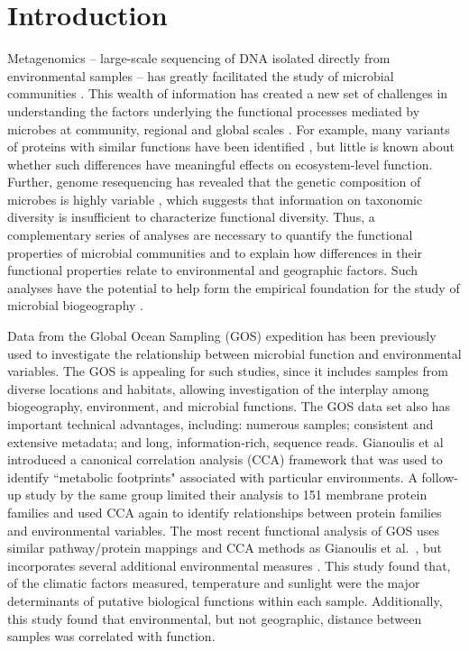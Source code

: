 \section{Introduction}

Metagenomics -- large-scale sequencing of DNA isolated directly from environmental samples -- has greatly facilitated the study of microbial communities \cite{RiesSchl04, Eise07, WoolGodz10, Hand04, RuscHalp07, DinsEdwa08}. This wealth of information has created a new set of challenges in understanding the factors underlying the functional processes mediated by microbes at community, regional and global scales \cite{Eise07}.  For example, many variants of proteins with similar functions have been identified \cite{YoosSutt07}, but little is known about whether such differences have meaningful effects on ecosystem-level function. Further, genome resequencing has revealed that the genetic composition of microbes is highly variable \cite{PernPlun01, TettMasi05, rasko_2008, KislHaeg11, BateCrop11}, which suggests that information on taxonomic diversity is insufficient to characterize functional diversity.  Thus, a complementary series of analyses are necessary to quantify the functional properties of microbial communities and to explain how differences in their functional properties relate to environmental and geographic factors. Such analyses have the potential to help form the empirical foundation for the study of microbial biogeography \cite{MartBoha06,GreeBoha06, GreeBoha08, NemeCost11}.

Data from the Global Ocean Sampling (GOS) \cite{RuscHalp07} expedition has been previously used to investigate the relationship between microbial function and environmental variables. The GOS is appealing for such studies, since it includes samples from diverse locations and habitats, allowing investigation of the interplay among biogeography, environment, and microbial functions. The GOS data set also has important technical advantages, including: numerous samples; consistent and extensive metadata; and long, information-rich, sequence reads. Gianoulis et al\ \cite{GianRaes09} introduced a canonical correlation analysis (CCA) framework that was used to identify ``metabolic footprints" associated with particular environments. A follow-up study \cite{PateGian10} by the same group limited their analysis to 151 membrane protein families and used CCA again to identify relationships between protein families and environmental variables. The most recent functional analysis of GOS uses similar pathway/protein mappings and CCA methods as Gianoulis et al.\ \cite{GianRaes09,PateGian10}, but incorporates several additional environmental measures \cite{RaesLetu11}.  This study found that, of the climatic factors measured, temperature and sunlight were the major determinants of putative biological functions within each sample. Additionally, this study found that environmental, but not geographic, distance between samples was correlated with function. 

